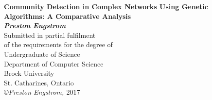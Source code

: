 \begin{titlepage}
\begin{center}

{\LARGE {\bf 
Community Detection in Complex Networks Using Genetic Algorithms: \linebreak 
A Comparative Analysis}}
\\[3cm]
{\large{ \bf \textit{Preston Engstrom}}}
\\[3cm]
{\large Submitted in partial fulfilment\\ of the requirements for the degree of\\ [1cm]
Undergraduate of Science}
\\[4cm]
{\large Department of Computer Science\\Brock University\\
St. Catharines, Ontario}
\\[5cm]
\copyright \textit{Preston Engstrom, $ 2017 $}

\end{center}
\end{titlepage}

